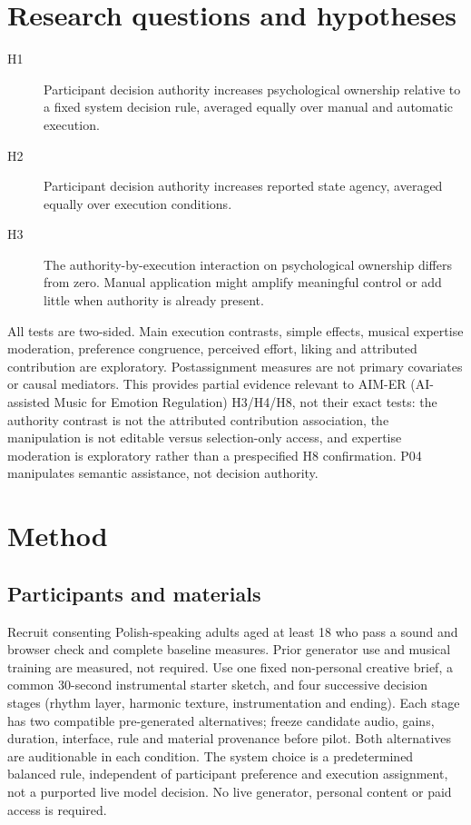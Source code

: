 \documentclass[11pt]{article}
\begin{document}
\section{Research questions and hypotheses}
\begin{description}
\item[H1] Participant decision authority increases psychological ownership relative to a fixed system decision rule, averaged equally over manual and automatic execution.
\item[H2] Participant decision authority increases reported state agency, averaged equally over execution conditions.
\item[H3] The authority-by-execution interaction on psychological ownership differs from zero. Manual application might amplify meaningful control or add little when authority is already present.
\end{description}
All tests are two-sided. Main execution contrasts, simple effects, musical expertise moderation, preference congruence, perceived effort, liking and attributed contribution are exploratory. Postassignment measures are not primary covariates or causal mediators. This provides partial evidence relevant to AIM-ER (AI-assisted Music for Emotion Regulation) H3/H4/H8, not their exact tests: the authority contrast is not the attributed contribution association, the manipulation is not editable versus selection-only access, and expertise moderation is exploratory rather than a prespecified H8 confirmation. P04 manipulates semantic assistance, not decision authority.
\section{Method}
\subsection{Participants and materials}
Recruit consenting Polish-speaking adults aged at least 18 who pass a sound and browser check and complete baseline measures. Prior generator use and musical training are measured, not required. Use one fixed non-personal creative brief, a common 30-second instrumental starter sketch, and four successive decision stages (rhythm layer, harmonic texture, instrumentation and ending). Each stage has two compatible pre-generated alternatives; freeze candidate audio, gains, duration, interface, rule and material provenance before pilot. Both alternatives are auditionable in each condition. The system choice is a predetermined balanced rule, independent of participant preference and execution assignment, not a purported live model decision. No live generator, personal content or paid access is required.
\end{document}
